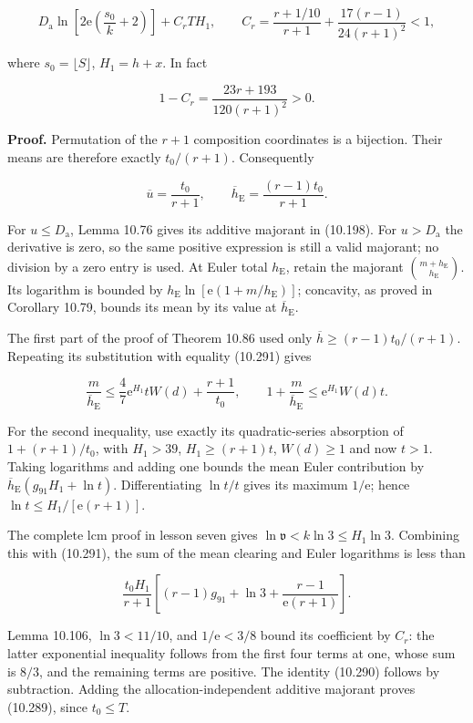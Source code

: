 \documentclass[
  11pt,
  a4paper,
]{article}
\begin{document}
\[
D_{\mathrm a}\ln\!\left[2\mathrm e\left(\frac{s_0}{k}+2\right)\right]
 + C_rTH_1,
\qquad
C_r=\frac{r+1/10}{r+1}
 +\frac{17(r-1)}{24(r+1)^2}<1,
\tag{10.289}
\]

where \(s_0=\lfloor S\rfloor\), \(H_1=h+x\). In fact

\[
1-C_r=\frac{23r+193}{120(r+1)^2}>0.
\tag{10.290}
\]

\textbf{Proof.} Permutation of the \(r+1\) composition coordinates is a
bijection. Their means are therefore exactly \(t_0/(r+1)\). Consequently

\[
\overline u=\frac{t_0}{r+1},\qquad
\overline h_{\mathrm E}=\frac{(r-1)t_0}{r+1}.
\tag{10.291}
\]

For \(u\le D_{\mathrm a}\), Lemma 10.76 gives its additive majorant in
(10.198). For \(u>D_{\mathrm a}\) the derivative is zero, so the same
positive expression is still a valid majorant; no division by a zero
entry is used. At Euler total \(h_{\mathrm E}\), retain the majorant
\(\binom{m+h_{\mathrm E}}{h_{\mathrm E}}\). Its logarithm is bounded by
\(h_{\mathrm E}\ln[\mathrm e(1+m/h_{\mathrm E})]\); concavity, as proved
in Corollary 10.79, bounds its mean by its value at
\(\overline h_{\mathrm E}\).

The first part of the proof of Theorem 10.86 used only
\(\overline h\ge(r-1)t_0/(r+1)\). Repeating its substitution with
equality (10.291) gives

\[
\frac m{\overline h_{\mathrm E}}
\le\frac47\mathrm e^{H_1}tW(d)+\frac{r+1}{t_0},
\qquad
1+\frac m{\overline h_{\mathrm E}}
\le\mathrm e^{H_1}W(d)t.
\tag{10.292}
\]

For the second inequality, use exactly its quadratic-series absorption
of \(1+(r+1)/t_0\), with \(H_1>39\), \(H_1\ge(r+1)t\), \(W(d)\ge1\) and
now \(t>1\). Taking logarithms and adding one bounds the mean Euler
contribution by \(\overline h_{\mathrm E}(g_{91}H_1+\ln t)\).
Differentiating \(\ln t/t\) gives its maximum \(1/\mathrm e\); hence
\(\ln t\le H_1/[\mathrm e(r+1)]\).

The complete lcm proof in lesson seven gives
\(\ln\mathfrak v<k\ln3\le H_1\ln3\). Combining this with (10.291), the
sum of the mean clearing and Euler logarithms is less than

\[
\frac{t_0H_1}{r+1}
\left[(r-1)g_{91}+\ln3+
             \frac{r-1}{\mathrm e(r+1)}\right].
\tag{10.293}
\]

Lemma 10.106, \(\ln3<11/10\), and \(1/\mathrm e<3/8\) bound its
coefficient by \(C_r\): the latter exponential inequality follows from
the first four terms at one, whose sum is \(8/3\), and the remaining
terms are positive. The identity (10.290) follows by subtraction. Adding
the allocation-independent additive majorant proves (10.289), since
\(t_0\le T\).
\end{document}
